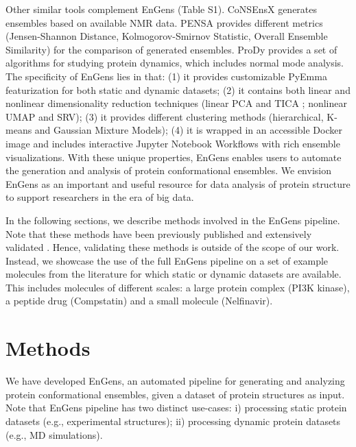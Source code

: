 \documentclass[numsec,webpdf,contemporary,large]{oup-authoring-template}
\theoremstyle{thmstyleone}%
\theoremstyle{thmstyletwo}%
\theoremstyle{thmstylethree}%
\begin{document}
Other similar tools complement EnGens (Table S1). CoNSEnsX \citep{angyan_consensx_2010} generates ensembles based on available NMR data. PENSA \citep{vogele_systematic_2022, vogele_drorlabpensa_2022} provides different metrics (Jensen-Shannon Distance, Kolmogorov-Smirnov Statistic, Overall Ensemble Similarity) for the comparison of generated ensembles. ProDy \citep{bakan_prody_2011, zhang_prody_2021} provides a set of algorithms for studying protein dynamics, which includes normal mode analysis. The specificity of EnGens lies in that: (1) it provides customizable PyEmma featurization for both static and dynamic datasets; (2) it contains both linear and nonlinear dimensionality reduction techniques (linear PCA \citep{pearson_liii_1901} and TICA \citep{perez-hernandez_identification_2013, schwantes_modeling_2015}; nonlinear UMAP and SRV); (3) it provides different clustering methods (hierarchical, K-means and Gaussian Mixture Models); (4) it is wrapped in an accessible Docker image and includes interactive Jupyter Notebook Workflows with rich ensemble visualizations. With these unique properties, EnGens enables users to automate the generation and analysis of protein conformational ensembles. We envision EnGens as an important and useful resource for data analysis of protein structure to support researchers in the era of big data.

In the following sections, we describe methods involved in the EnGens pipeline. Note that these methods have been previously published and extensively validated \citep{scherer_pyemma_2015, chen_nonlinear_2019, trozzi_umap_2021, perez-hernandez_identification_2013, schwantes_modeling_2015}. Hence, validating these methods is outside of the scope of our work. Instead, we showcase the use of the full EnGens pipeline on a set of example molecules from the literature for which static or dynamic datasets are available. This includes molecules of different scales: a large protein complex (PI3K kinase), a peptide drug (Compstatin) and a small molecule (Nelfinavir). 

\section{Methods}\label{sec2}

We have developed EnGens, an automated pipeline for generating and analyzing protein conformational ensembles, given a dataset of protein structures as input. Note that EnGens pipeline has two distinct use-cases: i) processing static protein datasets (e.g., experimental structures); ii) processing  dynamic protein datasets (e.g., MD simulations). 
\end{document}
